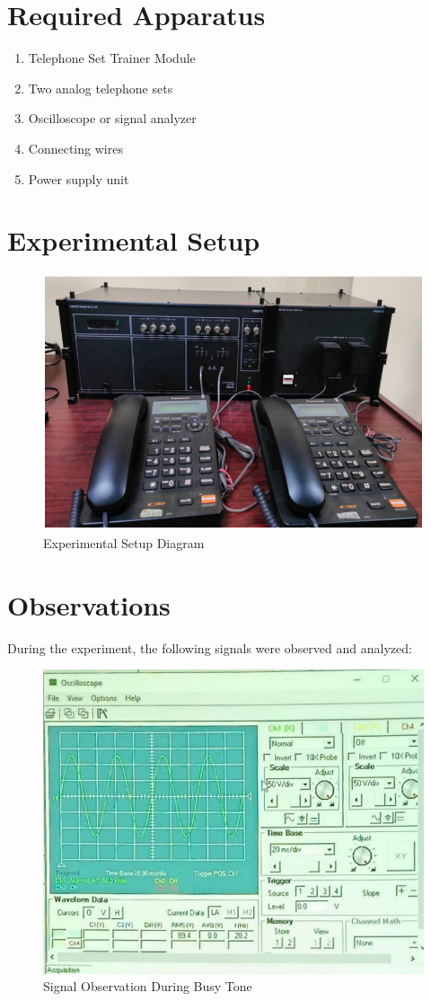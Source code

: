 \documentclass[a4paper,12pt]{article}
\begin{document}
	\section{Required Apparatus}
	\begin{enumerate}
		\item Telephone Set Trainer Module
		\item Two analog telephone sets
		\item Oscilloscope or signal analyzer
		\item Connecting wires
		\item Power supply unit
	\end{enumerate}
	
	\section{Experimental Setup}
	\begin{figure}[H]
		\centering
	\includegraphics[width=0.68\linewidth]{Images/3}
		\caption{Experimental Setup Diagram}
		\label{fig:setup}
	\end{figure}
	
	\section{Observations}
	During the experiment, the following signals were observed and analyzed:
	
	\begin{figure}[H]
		\centering
	\includegraphics[width=0.68\linewidth]{Images/5}
		\caption{Signal Observation During Busy Tone}
		\label{fig:busy}
	\end{figure}
	
\end{document}

